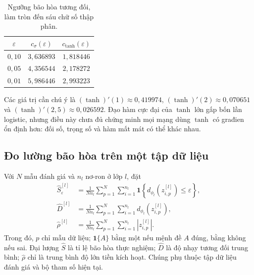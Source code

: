 \begin{table}[htbp]
\centering
\caption{Ngưỡng bão hòa tương đối, làm tròn đến sáu chữ số thập phân.}
\label{kt:tab:threshold}
\begin{tabular}{@{}ccc@{}}
\toprule
$\varepsilon$&$c_\sigma(\varepsilon)$&$c_{\tanh}(\varepsilon)$\\
\midrule
$0{,}10$&$3{,}636893$&$1{,}818446$\\
$0{,}05$&$4{,}356544$&$2{,}178272$\\
$0{,}01$&$5{,}986446$&$2{,}993223$\\
\bottomrule
\end{tabular}
\end{table}

Các giá trị cần chú ý là
$(\tanh)'(1)\approx0{,}419974$,
$(\tanh)'(2)\approx0{,}070651$ và
$(\tanh)'(2{,}5)\approx0{,}026592$.
Đạo hàm cực đại của $\tanh$ lớn gấp bốn lần logistic, nhưng điều
này chưa đủ chứng minh mọi mạng dùng $\tanh$ có građien ổn định hơn:
đối số, trọng số và hàm mất mát có thể khác nhau.


\subsection{Đo lường bão hòa trên một tập dữ liệu}

Với $N$ mẫu đánh giá và $n_l$ nơ-ron ở lớp $l$, đặt
\begin{align}
 \widehat S_{\varepsilon}^{[l]}
 &=\frac1{Nn_l}\sum_{p=1}^N\sum_{i=1}^{n_l}
   \mathbf1\!\left\{d_{\phi_l}(z_{i,p}^{[l]})\leq\varepsilon\right\},
      \label{kt:eq:saturation-fraction}\\
 \widehat D^{[l]}
 &=\frac1{Nn_l}\sum_{p=1}^N\sum_{i=1}^{n_l}
                         d_{\phi_l}(z_{i,p}^{[l]}),
      \label{kt:eq:mean-derivative}\\
 \widehat\rho^{[l]}
 &=\frac1{Nn_l}\sum_{p=1}^N\sum_{i=1}^{n_l}|z_{i,p}^{[l]}|.
      \label{kt:eq:mean-preactivation}
\end{align}
Trong đó, $p$ chỉ mẫu dữ liệu; $\mathbf1\{A\}$ bằng một nếu mệnh
đề $A$ đúng, bằng không nếu sai. Đại lượng $\widehat S$ là tỉ lệ
bão hòa thực nghiệm; $\widehat D$ là độ nhạy tương đối trung bình;
$\widehat\rho$ chỉ là trung bình độ lớn tiền kích hoạt. Chúng phụ
thuộc tập dữ liệu đánh giá và bộ tham số hiện tại.

